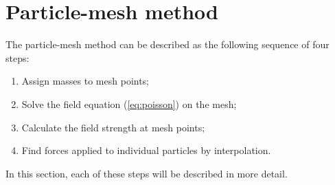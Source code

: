 \chapter{Particle-mesh method} %
The particle-mesh method can be described as the following sequence of four steps:
\begin{enumerate}
    \item Assign masses to mesh points;
    \item Solve the field equation (\autoref{eq:poisson}) on the mesh;
    \item Calculate the field strength at mesh points;
    \item Find forces applied to individual particles by interpolation.
\end{enumerate}
In this section, each of these steps will be described in more detail.







